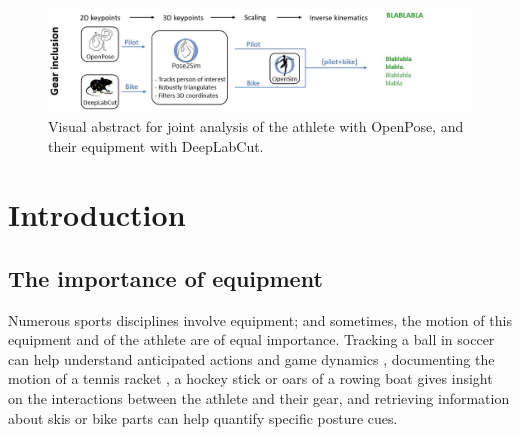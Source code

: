 \newpage

\minitoc

\vspace*{3cm}

\begin{figure}[hbtp]
	\centering
	\def\svgwidth{1\columnwidth}
	\fontsize{10pt}{10pt}\selectfont
	\includegraphics[width=\linewidth]{"../Intro/Figures/Fig_VisAbstract5.JPG"}
      \caption{Visual abstract for joint analysis of the athlete with OpenPose, and their equipment with DeepLabCut.}
	\label{fig_visabstract5}
\end{figure}

\newpage


\section{Introduction}
\subsection{The importance of equipment}

Numerous sports disciplines involve equipment; and sometimes, the motion of this equipment and of the athlete are of equal importance. Tracking a ball in soccer can help understand anticipated actions and game dynamics \cite{Ghasemzadeh2021}, documenting the motion of a tennis racket \cite{Martin2013}, a hockey stick \cite{Kays2017} or oars of a rowing boat \cite{Ruffaldi2015} gives insight on the interactions between the athlete and their gear, and retrieving information about skis \cite{Ludwig2020} or bike parts \cite{Rosenhahn2008} can help quantify specific posture cues.

